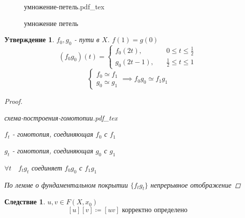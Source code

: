 \documentclass[a4paper]{article}
\newcommand{\incfig}[1]{%
\def\svgwidth{\columnwidth}
{#1.pdf_tex}
}
\newtheorem*{statement}{Утверждение}
\newtheorem*{corollary}{Следствие}
\theoremstyle{definition}
\theoremstyle{remark}
\begin{document}
\begin{figure}[ht]
    \centering
    \incfig{умножение-петель}
    \caption{умножение петель}
    \label{fig:умножение-петель}
\end{figure}

\begin{tcolorbox}
    \begin{statement}
        $ f_0, g_0 $ - пути в $ X $. $ f(1) = g(0) $ \\
        \[
            (f_0 g_0)(t) = 
            \begin{cases}
                f_0(2t), &\quad 0 \leq t \leq \frac{1}{2} \\
                g_0(2t-1), &\quad \frac{1}{2} \leq t \leq 1
            \end{cases}
        \]
        \[
            \begin{cases}
                f_0 \simeq f_1 \\
                g_0 \simeq g_1
            \end{cases} \implies
            f_0 g_0 \simeq f_1 g_1
        \]
        \begin{proof}
            \begin{center}
                \incfig{схема-построения-гомотопии}
            \end{center}

            $ f_t $ - гомотопия, соединяющая $ f_0 $ с $ f_1 $

            $ g_t $ - гомотопия, соединяющая $ g_0 $ с $ g_1 $ 

            $ \forall t \quad f_t g_t $ соединяет $ f_0 g_0 $ с $ f_1 g_1 $ 

            По лемме о фундаментальном покрытии $ \{ f_t g_t \} $ непрерывное отображение
        \end{proof}
    \end{statement}

    \begin{corollary}
        $ u,v \in F(X, x_0) $ 
        \[
            [u][v] \coloneqq [uv] \text{ корректно определено}
        \]
    \end{corollary}
\end{tcolorbox}
\end{document}
